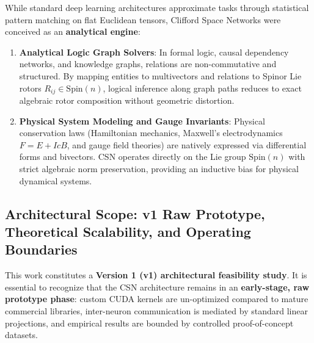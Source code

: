 \documentclass[11pt,a4paper]{article}
\begin{document}
While standard deep learning architectures approximate tasks through statistical pattern matching on flat Euclidean tensors, Clifford Space Networks were conceived as an \textbf{analytical engine}:
\begin{enumerate}[leftmargin=*]
    \item \textbf{Analytical Logic Graph Solvers}: In formal logic, causal dependency networks, and knowledge graphs, relations are non-commutative and structured. By mapping entities to multivectors and relations to Spinor Lie rotors $R_{ij} \in \mathrm{Spin}(n)$, logical inference along graph paths reduces to exact algebraic rotor composition without geometric distortion.
    \item \textbf{Physical System Modeling and Gauge Invariants}: Physical conservation laws (Hamiltonian mechanics, Maxwell's electrodynamics $F = E + I c B$, and gauge field theories) are natively expressed via differential forms and bivectors. CSN operates directly on the Lie group $\mathrm{Spin}(n)$ with strict algebraic norm preservation, providing an inductive bias for physical dynamical systems.
\end{enumerate}

\subsection{Architectural Scope: v1 Raw Prototype, Theoretical Scalability, and Operating Boundaries}

This work constitutes a \textbf{Version 1 (v1) architectural feasibility study}. It is essential to recognize that the CSN architecture remains in an \textbf{early-stage, raw prototype phase}: custom CUDA kernels are un-optimized compared to mature commercial libraries, inter-neuron communication is mediated by standard linear projections, and empirical results are bounded by controlled proof-of-concept datasets.
\end{document}
